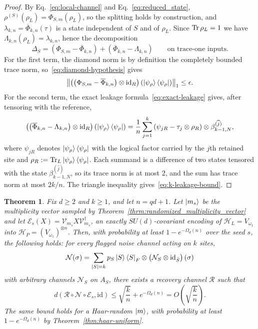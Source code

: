 \documentclass[11pt,letterpaper]{article}
\theoremstyle{plain}
\theoremstyle{plain}
\theoremstyle{plain}
\theoremstyle{plain}
\theoremstyle{plain}
\theoremstyle{plain}
\theoremstyle{plain}
\newtheorem{smtheorem}{Theorem}[section]
\theoremstyle{definition}
\theoremstyle{plain}
\begin{document}
\begin{proof}
    By Eq.~\eqref{eq:local-channel} and Eq.~\eqref{eq:reduced_state}, $\rho^{(S)}(\rho_L)=\Phi_{S,m}(\rho_L)$, so the splitting holds by construction, and $\lambda_{k,n}=\overline\Phi_{k,n}(\tau)$ is a state independent of $S$ and of $\rho_L$.  Since $\Tr\rho_L=1$ we have $\Lambda_{k,n}(\rho_L)=\lambda_{k,n}$, hence the decomposition
    \[
        \Delta_S
        =
        \left(\Phi_{S,m}-\overline\Phi_{k,n}\right)
        +
        \left(\overline\Phi_{k,n}-\Lambda_{k,n}\right)
        \qquad\text{on trace-one inputs.}
    \]
    For the first term, the diamond norm is by definition the completely bounded trace norm, so~\eqref{eq:diamond-hypothesis} gives
    \[
        \left\|
        \left(\left(\Phi_{S,m}-\overline\Phi_{k,n}\right)\otimes\mathrm{id}_R\right)
        \left(\ket{\psi_\rho}\bra{\psi_\rho}\right)
        \right\|_1
        \le\epsilon .
    \]
    For the second term, the exact leakage formula~\eqref{eq:exact-leakage} gives, after tensoring with the reference,
    \[
        \left(\left(\overline\Phi_{k,n}-\Lambda_{k,n}\right)\otimes\mathrm{id}_R\right)
        \left(\ket{\psi_\rho}\bra{\psi_\rho}\right)
        =
        \frac1n\sum_{j=1}^k
        \left(
            \psi_{jR}-\tau_j\otimes\rho_R
        \right)
        \otimes
        \beta_{k-1,N}^{(\widehat j)},
    \]
    where $\psi_{jR}$ denotes $\ket{\psi_\rho}\bra{\psi_\rho}$ with the logical factor carried by the $j$th retained site and $\rho_R:=\Tr_L\ket{\psi_\rho}\bra{\psi_\rho}$. 
    Each summand is a difference of two states tensored with the state $\beta_{k-1,N}^{(\widehat j)}$, so its trace norm is at most $2$, and the sum has trace norm at most $2k/n$. 
    The triangle inequality gives~\eqref{eq:k-leakage-bound}.
\end{proof}

\begin{smtheorem}\label{thrm:k_arb_scale}
    Fix $d\ge2$ and $k\ge1$, and let $n=qd+1$. 
    Let $\ket{m_s}$ be the multiplicity vector sampled by Theorem~\ref{thrm:randomized_multiplicity_vector} and let $\mathcal E_s(X)=\mathcal{V}_{m_s}X\mathcal{V}_{m_s}^\dagger$, 
    an exactly $SU(d)$-covariant encoding of $\mathcal H_L=V_{\omega_1}$ into $\mathcal H_P=(V_{\omega_1})^{\otimes n}$. 
    Then, with probability at least $1-e^{-\Omega_d(n)}$ over the seed $s$, the following holds: for every flagged noise channel acting on $k$ sites,
    \[
        \mathcal N(\sigma)
        =
        \sum_{|S|=k}
        p_S
        \ket S\bra S_F
        \otimes
        \left(\mathcal N_S\otimes\mathrm{id}_{\hat S}\right)(\sigma)
    \]
    with arbitrary channels $\mathcal N_S$ on $A_S$, there exists a recovery channel $\mathcal R$ such that
    \begin{equation}
    \label{eq:k-arb-bound}
        d(\mathcal R\circ\mathcal N\circ\mathcal E_s,\mathrm{id})
        \le
        \sqrt{\frac kn}
        +
        e^{-\Omega_d(n)}
        =
        O\!\left(\sqrt{\frac kn}\right).
    \end{equation}
    The same bound holds for a Haar-random $\ket m$, with probability at least $1-e^{-\Omega_d(n)}$ by Theorem~\ref{thm:haar-uniform}.
\end{smtheorem}
\end{document}
